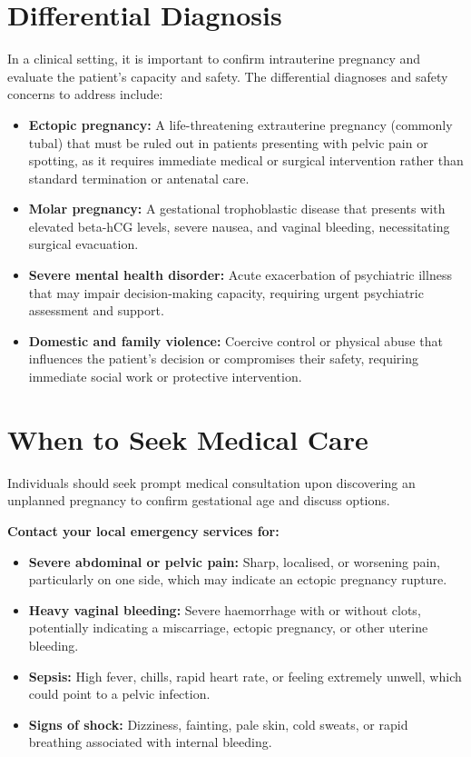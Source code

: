 \section*{Differential Diagnosis}
In a clinical setting, it is important to confirm intrauterine pregnancy and evaluate the patient's capacity and safety. The differential diagnoses and safety concerns to address include:
\begin{itemize}
    \item \textbf{Ectopic pregnancy:} A life-threatening extrauterine pregnancy (commonly tubal) that must be ruled out in patients presenting with pelvic pain or spotting, as it requires immediate medical or surgical intervention rather than standard termination or antenatal care.
    \item \textbf{Molar pregnancy:} A gestational trophoblastic disease that presents with elevated beta-hCG levels, severe nausea, and vaginal bleeding, necessitating surgical evacuation.
    \item \textbf{Severe mental health disorder:} Acute exacerbation of psychiatric illness that may impair decision-making capacity, requiring urgent psychiatric assessment and support.
    \item \textbf{Domestic and family violence:} Coercive control or physical abuse that influences the patient's decision or compromises their safety, requiring immediate social work or protective intervention.
\end{itemize}

\section*{When to Seek Medical Care}
Individuals should seek prompt medical consultation upon discovering an unplanned pregnancy to confirm gestational age and discuss options.

\textbf{Contact your local emergency services for:}
\begin{itemize}
    \item \textbf{Severe abdominal or pelvic pain:} Sharp, localised, or worsening pain, particularly on one side, which may indicate an ectopic pregnancy rupture.
    \item \textbf{Heavy vaginal bleeding:} Severe haemorrhage with or without clots, potentially indicating a miscarriage, ectopic pregnancy, or other uterine bleeding.
    \item \textbf{Sepsis:} High fever, chills, rapid heart rate, or feeling extremely unwell, which could point to a pelvic infection.
    \item \textbf{Signs of shock:} Dizziness, fainting, pale skin, cold sweats, or rapid breathing associated with internal bleeding.
\end{itemize}


